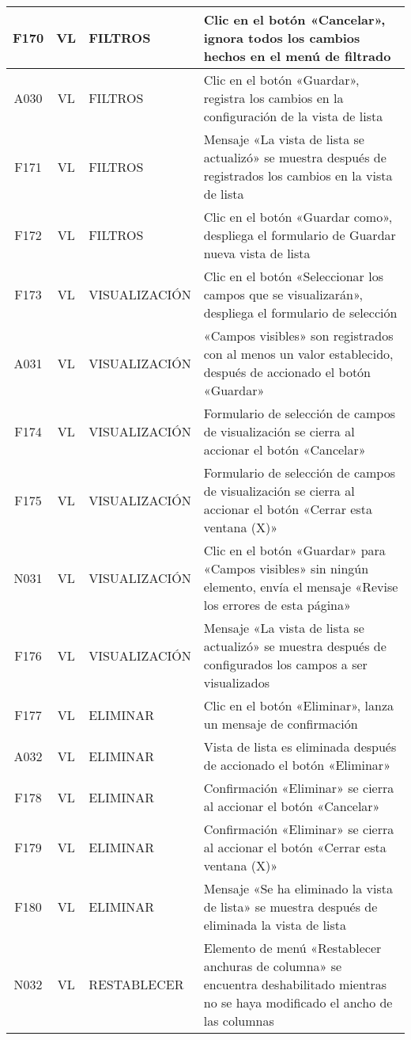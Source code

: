 \begin{landscape}
{\begin{longtable}[htb]{|c|c|p{5.0cm}|p{14.0cm}|}
F170 & VL & FILTROS & Clic en el botón «Cancelar», ignora todos los cambios hechos en el menú de filtrado \\ \hline
A030 & VL & FILTROS & Clic en el botón «Guardar», registra los cambios en la configuración de la vista de lista \\ \hline
F171 & VL & FILTROS & Mensaje «La vista de lista se actualizó» se muestra después de registrados los cambios en la vista de lista \\ \hline
F172 & VL & FILTROS & Clic en el botón «Guardar como», despliega el formulario de Guardar nueva vista de lista \\ \hline
F173 & VL & VISUALIZACIÓN & Clic en el botón «Seleccionar los campos que se visualizarán», despliega el formulario de selección \\ \hline
A031 & VL & VISUALIZACIÓN & «Campos visibles» son registrados con al menos un valor establecido, después de accionado el botón «Guardar» \\ \hline
F174 & VL & VISUALIZACIÓN & Formulario de selección de campos de visualización se cierra al accionar el botón «Cancelar» \\ \hline
F175 & VL & VISUALIZACIÓN & Formulario de selección de campos de visualización se cierra al accionar el botón «Cerrar esta ventana (X)» \\ \hline
N031 & VL & VISUALIZACIÓN & Clic en el botón «Guardar» para «Campos visibles» sin ningún elemento, envía el mensaje «Revise los errores de esta página» \\ \hline
F176 & VL & VISUALIZACIÓN & Mensaje «La vista de lista se actualizó» se muestra después de configurados los campos a ser visualizados \\ \hline
F177 & VL & ELIMINAR & Clic en el botón «Eliminar», lanza un mensaje de confirmación \\ \hline
A032 & VL & ELIMINAR & Vista de lista es eliminada después de accionado el botón «Eliminar» \\ \hline
F178 & VL & ELIMINAR & Confirmación «Eliminar» se cierra al accionar el botón «Cancelar» \\ \hline
F179 & VL & ELIMINAR & Confirmación «Eliminar» se cierra al accionar el botón «Cerrar esta ventana (X)» \\ \hline
F180 & VL & ELIMINAR & Mensaje «Se ha eliminado la vista de lista» se muestra después de eliminada la vista de lista \\ \hline
N032 & VL & RESTABLECER & Elemento de menú «Restablecer anchuras de columna» se encuentra deshabilitado mientras no se haya modificado el ancho de las columnas \\ \hline

\end{longtable}}
\end{landscape}
